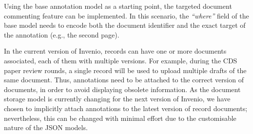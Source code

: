 
Using the base annotation model as a starting point, the targeted document
commenting feature can be implemented. In this scenario, the \textit{``where''}
field of the base model needs to encode both the document identifier and the
exact target of the annotation (e.g., the second page).

In the current version of Invenio, records can have one or more documents
associated, each of them with multiple versions. For example, during the CDS
paper review rounds, a single record will be used to upload multiple drafts of
the same document. Thus, annotations need to be attached to the correct version
of documents, in order to avoid displaying obsolete information. As the document
storage model is currently changing for the next version of Invenio, we have
chosen to implicitly attach annotations to the latest version of record
documents; nevertheless, this can be changed with minimal effort due to the
customisable nature of the JSON models.

\newpage

